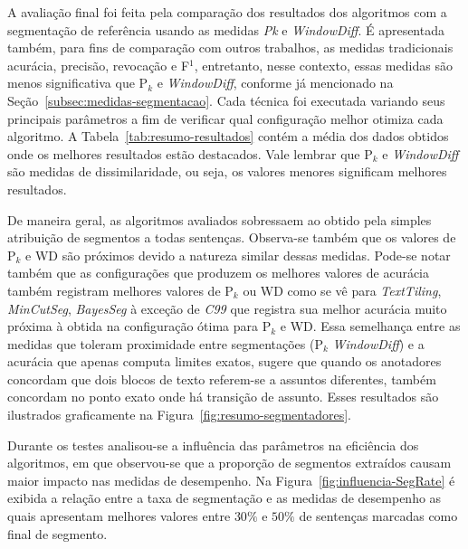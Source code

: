 A avaliação final foi feita pela comparação dos resultados dos algoritmos com a segmentação de referência usando as medidas \textit{Pk} e \textit{WindowDiff}. É apresentada também, para fins de comparação com outros trabalhos, as medidas tradicionais acurácia, precisão, revocação e F$^1$, entretanto, nesse contexto, essas medidas são menos significativa que P$_k$ e \textit{WindowDiff}, conforme já mencionado na Seção~\ref{subsec:medidas-segmentacao}. 
Cada técnica foi executada variando seus principais parâmetros a fim de verificar qual configuração melhor otimiza cada algoritmo. A Tabela~\ref{tab:resumo-resultados} contém a média dos dados obtidos onde os melhores resultados estão destacados. Vale lembrar que P$_k$ e \textit{WindowDiff} são medidas de dissimilaridade, ou seja, os valores menores significam melhores resultados.





De maneira geral, as algoritmos avaliados sobressaem ao obtido pela simples atribuição de segmentos a todas sentenças. Observa-se também que os valores de P$_k$ e WD são próximos devido a natureza similar dessas medidas. Pode-se notar também que as configurações que produzem os melhores valores de acurácia também registram melhores valores de P$_k$ ou WD como se vê para \textit{TextTiling}, \textit{MinCutSeg}, \textit{BayesSeg} à exceção de \textit{C99} que registra sua melhor acurácia muito próxima à obtida na configuração ótima para P$_k$ e WD. 
Essa semelhança entre as medidas que toleram proximidade entre segmentações (P$_k$ \textit{WindowDiff}) e a acurácia que apenas computa limites exatos, sugere que quando os anotadores concordam que dois blocos de texto referem-se a assuntos diferentes, também concordam no ponto exato onde há transição de assunto.  Esses resultados são ilustrados graficamente na Figura~\ref{fig:resumo-segmentadores}.



Durante os testes analisou-se a influência das parâmetros na eficiência dos algoritmos, em que observou-se que a proporção de segmentos extraídos causam maior impacto nas medidas de desempenho. Na Figura~\ref{fig:influencia-SegRate} é exibida a relação entre a taxa de segmentação e as medidas de desempenho as quais apresentam melhores valores entre $30\%$ e $50\%$ de sentenças marcadas como final de segmento.



